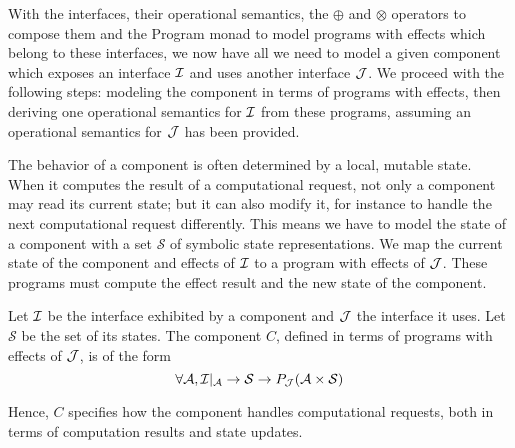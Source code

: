 With the interfaces, their operational semantics, the $\oplus$ and $\otimes$
operators to compose them and the Program monad to model programs with effects
which belong to these interfaces, we now have all we need to model a given
component which exposes an interface $\mathcal{I}$ and uses another interface $\mathcal{J}$.
%
We proceed with the following steps: modeling the component in terms of programs
with effects, then deriving one operational semantics for $\mathcal{I}$ from these
programs, assuming an operational semantics for $\mathcal{J}$ has been provided.

The behavior of a component is often determined by a local, mutable state.
%
When it computes the result of a computational request, not only a component may
read its current state; but it can also modify it, for instance to handle the
next computational request differently.
%
This means we have to model the state of a component with a set $\mathcal{S}$ of
symbolic state representations.
%
We map the current state of the component and effects of $\mathcal{I}$ to a program with
effects of $\mathcal{J}$.
%
These programs must compute the effect result and the new state of the
component.

\begin{definition}[Component]
  \label{def:freespec:component-model}

  Let $\mathcal{I}$ be the interface exhibited by a component and $\mathcal{J}$ the interface it
  uses.
  Let $\mathcal{S}$ be the set of its states.
  The component $C$, defined in terms of programs with effects of $\mathcal{J}$, is of
  the form
  \[ \forall \mathcal{A}, \mathcal{I}|_{\mathcal{A}} \rightarrow \mathcal{S}
    \rightarrow P_{\mathcal{J}}(\mathcal{A} \times \mathcal{S}) \]
\end{definition}

Hence, $C$ specifies how the component handles computational requests, both in
terms of computation results and state updates.

